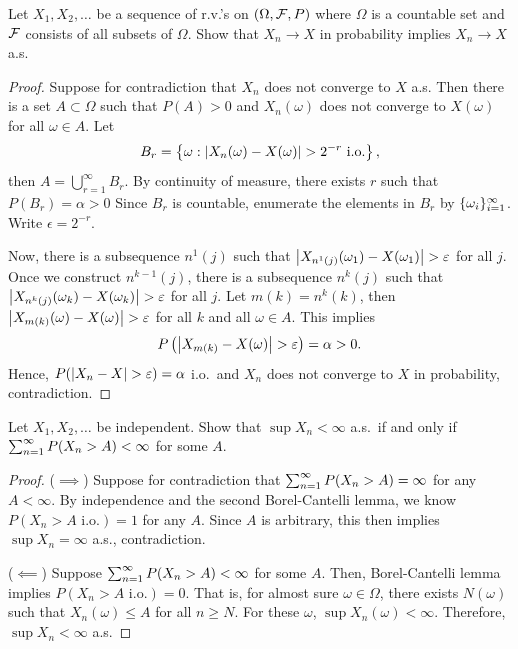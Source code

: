 \documentclass[a4paper]{article}
\begin{document}
\begin{ex}[Durrett 2.3.12]
  Let $X_1, X_2, \dots$ be a sequence of r.v.'s on $(\Omega, \mathcal{F}, P)$
  where $\Omega$ is a countable set and $\mathcal{F}$ consists of all subsets
  of $\Omega$. Show that $X_n \to X$ in probability implies
  $X_n \to X$ a.s.
\end{ex}

\begin{proof}
  Suppose for contradiction that $X_n$ does not converge to $X$ a.s.
  Then there is a set $A \subset \Omega$ such that $P(A) > 0$ and
  $X_n (\omega)$ does not converge to $X(\omega)$ for all $\omega \in A$.
  Let
  \[
    B_r = \left\{ \omega : \left\lvert X_n (\omega) - X (\omega)\right\rvert
    > 2^{-r} \text{ i.o.} \right\},
  \]
  then $A = \bigcup_{r=1}^\infty B_r$. By continuity of measure,
  there exists $r$ such that $P (B_r) = \alpha > 0$
  Since $B_r$ is countable, enumerate the elements in $B_r$ by
  $\{ \omega_i \}_{i=1}^\infty$. Write $\epsilon = 2^{-r}$.

  Now, there is a subsequence $n^1 (j)$ such that
  $\left\lvert X_{n^1 (j)} (\omega_1) - X(\omega_1)\right\rvert > \varepsilon$ for all $j$.
  Once we construct $n^{k - 1} (j)$, there is a subsequence $n^{k} (j)$
  such that $\left\lvert X_{n^k(j)} (\omega_k) - X (\omega_k)\right\rvert > \varepsilon$
  for all $j$. Let $m(k) = n^k (k)$, then
  $\left\lvert X_{m(k)} (\omega) - X(\omega)\right\rvert > \varepsilon$ for all $k$ and
  all $\omega \in A$. This implies
  \[
    P \left( \left\lvert X_{m(k)} - X(\omega)\right\rvert > \varepsilon \right)
    = \alpha > 0.
  \]
  Hence, $P (\left\lvert X_n - X\right\rvert > \varepsilon) = \alpha$ i.o.\ and $X_n$ does not
  converge to $X$ in probability, contradiction.

\end{proof}

\begin{ex}[Durrett 2.3.14]
  Let $X_1, X_2, \dots$ be independent. Show that $\sup X_n < \infty$ a.s.\
  if and only if $\sum_{n=1}^\infty P(X_n > A) < \infty$ for some $A$.
\end{ex}

\begin{proof}
  ($\implies$) Suppose for contradiction that
  $\sum_{n=1}^\infty P(X_n > A) = \infty$ for any $A < \infty$.
  By independence and the second Borel-Cantelli lemma,
  we know $P(X_n > A \text{ i.o.}) = 1$ for any $A$.
  Since $A$ is arbitrary, this then implies $\sup X_n = \infty$ a.s.,
  contradiction.

  ($\impliedby$) Suppose $\sum_{n=1}^\infty P(X_n > A) < \infty$ for some $A$.
  Then, Borel-Cantelli lemma implies $P (X_n > A \text{ i.o.}) = 0$.
  That is, for almost sure $\omega \in \Omega$, there exists
  $N(\omega)$ such that $X_n(\omega) \leq A$ for all $n \geq N$.
  For these $\omega$, $\sup X_n (\omega) < \infty$. Therefore,
  $\sup X_n < \infty$ a.s.

\end{proof}
\end{document}
